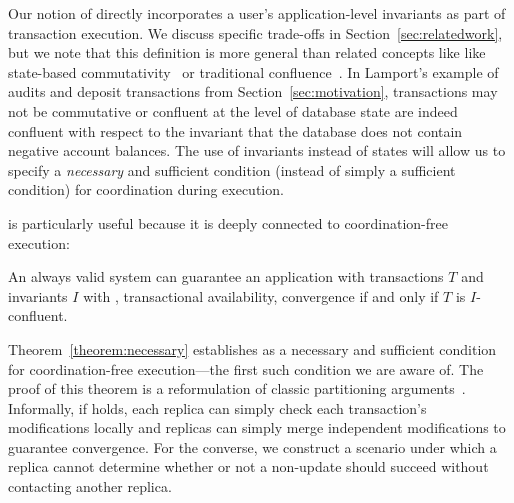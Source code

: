  Our notion of \iconfluence
directly incorporates a user's application-level invariants as part of
transaction execution. We discuss specific trade-offs in
Section~\ref{sec:relatedwork}, but we note that this definition is
more general than related concepts like like state-based
commutativity~\cite{weihl-thesis} or traditional
confluence~\cite{calm,termrewriting}. In Lamport's example of audits
and deposit transactions from Section~\ref{sec:motivation},
transactions may not be commutative or confluent at the level of
database state are indeed confluent with respect to the invariant that
the database does not contain negative account balances. The use of
invariants instead of states will allow us to specify a
\textit{necessary} and sufficient condition (instead of simply a
sufficient condition) for coordination during execution.

\iconfluence is particularly useful because it is deeply connected to
coordination-free execution:

\begin{theorem}
\label{theorem:necessary}
An always valid system can guarantee an application with transactions
$T$ and invariants $I$ with \cfreedom, transactional availability,
convergence if and only if $T$ is $I$-confluent.
\end{theorem}

Theorem~\ref{theorem:necessary} establishes \iconfluence as a
necessary and sufficient condition for coordination-free
execution---the first such condition we are aware of. The proof of
this theorem is a reformulation of classic partitioning
arguments~\cite{gilbert-cap}. Informally, if \iconfluence holds, each
replica can simply check each transaction's modifications locally and
replicas can simply merge independent modifications to guarantee
convergence. For the converse, we construct a scenario under which a
replica cannot determine whether or not a non-\iconfluent update
should succeed without contacting another replica.

